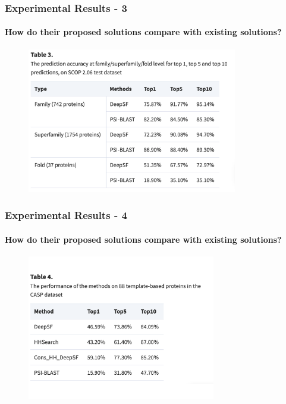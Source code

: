 \documentclass[xcolor={usenames,dvipsnames},hyperref={hyperindex,bookmarks}]{beamer}
\begin{document}
\frame
{
	\frametitle{Experimental Results - 3}
	\framesubtitle{How do their proposed solutions compare with existing solutions?}


	\begin{figure}[h]
	\centering 
	\includegraphics[height=2.5in]{./pics/table-3}
	\label{fig:Table3}
	\end{figure}
}




\frame
{
	\frametitle{Experimental Results - 4}
	\framesubtitle{How do their proposed solutions compare with existing solutions?}


	\begin{figure}[h]
	\centering 
	\includegraphics[height=2.5in]{./pics/table-4}
	\label{fig:Table4}
	\end{figure}
}
\end{document}
